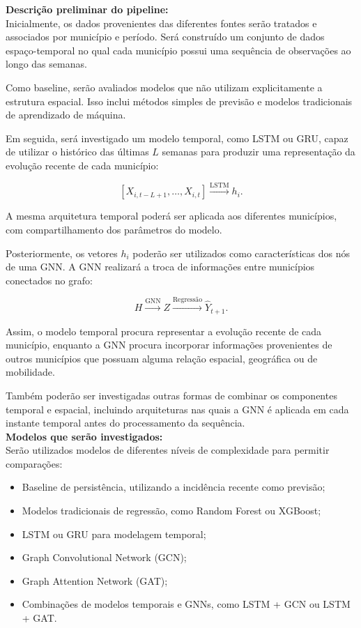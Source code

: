 \documentclass{article}
\begin{document}
\textbf{Descrição preliminar do pipeline:} \\
Inicialmente, os dados provenientes das diferentes fontes serão tratados e associados por município e período. Será construído um conjunto de dados espaço-temporal no qual cada município possui uma sequência de observações ao longo das semanas.

Como baseline, serão avaliados modelos que não utilizam explicitamente a estrutura espacial. Isso inclui métodos simples de previsão e modelos tradicionais de aprendizado de máquina.

Em seguida, será investigado um modelo temporal, como LSTM ou GRU, capaz de utilizar o histórico das últimas $L$ semanas para produzir uma representação da evolução recente de cada município:

\[
[X_{i,t-L+1},\ldots,X_{i,t}]
\xrightarrow{\mathrm{LSTM}}
h_i.
\]

A mesma arquitetura temporal poderá ser aplicada aos diferentes municípios, com compartilhamento dos parâmetros do modelo.

Posteriormente, os vetores $h_i$ poderão ser utilizados como características dos nós de uma GNN. A GNN realizará a troca de informações entre municípios conectados no grafo:

\[
H
\xrightarrow{\mathrm{GNN}}
Z
\xrightarrow{\mathrm{Regressão}}
\hat{Y}_{t+1}.
\]

Assim, o modelo temporal procura representar a evolução recente de cada município, enquanto a GNN procura incorporar informações provenientes de outros municípios que possuam alguma relação espacial, geográfica ou de mobilidade.

Também poderão ser investigadas outras formas de combinar os componentes temporal e espacial, incluindo arquiteturas nas quais a GNN é aplicada em cada instante temporal antes do processamento da sequência. \\

\textbf{Modelos que serão investigados:} \\
Serão utilizados modelos de diferentes níveis de complexidade para permitir comparações:

\begin{itemize}
    \item Baseline de persistência, utilizando a incidência recente como previsão;
    \item Modelos tradicionais de regressão, como Random Forest ou XGBoost;
    \item LSTM ou GRU para modelagem temporal;
    \item Graph Convolutional Network (GCN);
    \item Graph Attention Network (GAT);
    \item Combinações de modelos temporais e GNNs, como LSTM + GCN ou LSTM + GAT.
\end{itemize}
\end{document}
